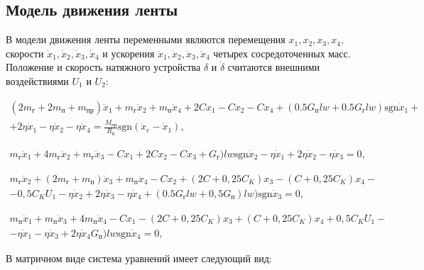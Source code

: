 \subsection{Модель движения ленты} \label{sect3_2_1}
В модели движения ленты переменными являются перемещения $ x_1, x_2, x_3, x_4 $, скорости $ \dot x_1, \dot x_2, \dot x_3, \dot x_4 $ и ускорения $ \ddot x_1, \ddot x_2, \ddot x_3, \ddot x_4 $ четырех сосредоточенных масс. Положение и скорость натяжного устройства $ \delta $ и $ \dot \delta $ считаются внешними воздействиями $ U_1 $ и $ U_2 $:

\begin{eqnarray}
	( 2m_{\text{г}} + 2m_{\text{п}} + m_{\text{пр}} ) \ddot x_1 +  
	m_{\text{г}} \ddot x_2 +  m_{\text{п}} \ddot x_4  + 
	2Cx_1 - Cx_2 - Cx_4 + 
	(0.5 G_{\text{п}} l w + 0.5 G_{\text{г}} l w ) \text{sgn} \dot x_1 +
    \nonumber \\
	+ 2 \eta \dot x_1 - \eta \dot x_2 - \eta \dot x_4 = 
	\frac{M_{\text{пр}}}{R_{\text{б}}} \text{sgn} (\dot x_c - \dot x_1),
\nonumber
\end{eqnarray}

\begin{eqnarray}
	m_{\text{г}} \ddot x_1 + 4 m_{\text{г}} \ddot x_2 +
	m_{\text{г}} \ddot x_3 - Cx_1 + 2Cx_2 - Cx_3 + 
	G_{\text{г}}) l w \text{sgn} \dot x_2  - 
	\eta \dot x_1 + 2 \eta \dot x_2 - \eta \dot x_3 = 0,
\nonumber
\end{eqnarray}

\begin{eqnarray}
	m_{\text{г}} \ddot x_2 + ( 2 m_{\text{г}} + m_{\text{п}} ) \ddot x_3 + 
	m_{\text{п}} \ddot x_4  - Cx_2 + (2C + 0,25C_K) x_3 - 
   (C + 0,25 C_K) x_4 - 
   \nonumber \\
   - 0,5C_K U_1 - \eta \dot x_2 + 2 \eta \dot x_3 - \eta \dot x_4 + 
   (0.5 G_{\text{г}} l w + 0,5 G_{\text{п}} ) l w) \text{sgn} \dot x_3 = 0,
\nonumber
\end{eqnarray}

\begin{eqnarray}
	m_{\text{п}} \ddot x_1 + m_{\text{п}} \ddot x_3 + 
	4 m_{\text{п}} \ddot x_4 - Cx_1 - 
    (2C + 0,25 C_K) x_3 + (C + 0,25 C_K) x_4 + 
    0,5 C_K U_1 -
    \nonumber \\
	- \eta \dot x_1 - \eta \dot x_3 + 2 \eta \dot x_4 G_{\text{п}}) l w \text{sgn} \dot x_4 = 0,
\nonumber
\end{eqnarray}

В матричном виде система уравнений имеет следующий вид:

